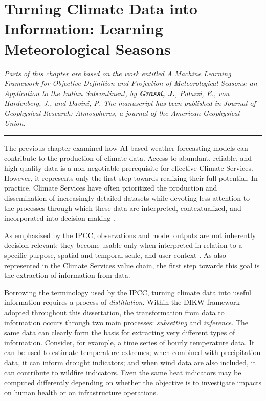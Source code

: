 \chapter{Turning Climate Data into Information: Learning Meteorological Seasons}
\label{chap:climate-information}

\ifpdf
  \graphicspath{{Chapter3/Figs/}{Chapter3/Figs/PDF/}}
\else
  \graphicspath{{Chapter3/Figs/Vector/}{Chapter3/Figs/}}
\fi

\noindent\textit{Parts of this chapter are based on the work entitled \emph{A Machine Learning Framework for Objective Definition and Projection of Meteorological Seasons: an Application to the Indian Subcontinent}, by \textbf{Grassi, J.}, Palazzi, E., von Hardenberg, J., and Davini, P. The manuscript has been published in Journal of Geophysical Research: Atmospheres, a journal of the American Geophysical Union.}

\vspace{0.5em}
\begin{center}
    \rule{0.5\textwidth}{0.4pt}
\end{center}
\vspace{0.5em}

The previous chapter examined how AI-based weather forecasting models can contribute to the production of climate data. Access to abundant, reliable, and high-quality data is a non-negotiable prerequisite for effective Climate Services. However, it represents only the first step towards realizing their full potential. In practice, Climate Services have often prioritized the production and dissemination of increasingly detailed datasets while devoting less attention to the processes through which these data are interpreted, contextualized, and incorporated into decision-making \citep{findlater_climate_2021}.

As emphasized by the IPCC, observations and model outputs are not inherently decision-relevant: they become usable only when interpreted in relation to a specific purpose, spatial and temporal scale, and user context \citep[Sections~10.5.1--10.5.4]{doblas-reyes_linking_2021}. As also represented in the Climate Services value chain, the first step towards this goal is the extraction of information from data.

Borrowing the terminology used by the IPCC, turning climate data into useful information requires a process of \emph{distillation}. Within the DIKW framework adopted throughout this dissertation, the transformation from data to information occurs through two main processes: \emph{subsetting} and \emph{inference}. The same data can clearly form the basis for extracting very different types of information. Consider, for example, a time series of hourly temperature data. It can be used to estimate temperature extremes; when combined with precipitation data, it can inform drought indicators; and when wind data are also included, it can contribute to wildfire indicators. Even the same heat indicators may be computed differently depending on whether the objective is to investigate impacts on human health or on infrastructure operations.

